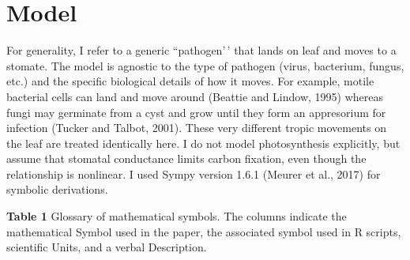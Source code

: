 \documentclass[utf8]{frontiersSCNS}
\begin{document}
\hypertarget{model}{%
\section*{Model}\label{model}}

For generality, I refer to a generic ``pathogen'\,' that lands on leaf
and moves to a stomate. The model is agnostic to the type of pathogen
(virus, bacterium, fungus, etc.) and the specific biological details of
how it moves. For example, motile bacterial cells can land and move
around (Beattie and Lindow, 1995) whereas fungi may germinate from a
cyst and grow until they form an appresorium for infection (Tucker and
Talbot, 2001). These very different tropic movements on the leaf are
treated identically here. I do not model photosynthesis explicitly, but
assume that stomatal conductance limits carbon fixation, even though the
relationship is nonlinear. I used Sympy version 1.6.1 (Meurer et al.,
2017) for symbolic derivations.

\textbf{Table 1} \textbar{} Glossary of mathematical symbols. The
columns indicate the mathematical Symbol used in the paper, the
associated symbol used in R scripts, scientific Units, and a verbal
Description.
\end{document}
